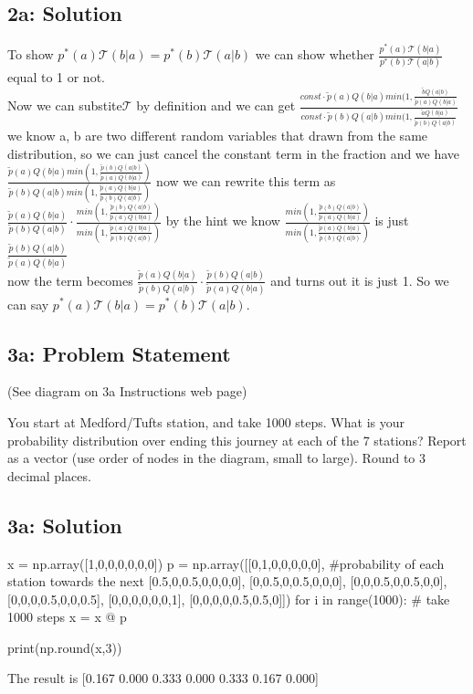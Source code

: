 \documentclass[10pt]{article}
\newcommand{\officialdirections}[1]{{\color{purple} #1}}
\begin{document}
\subsection{2a: Solution}
To show $p^*( a) \mathcal{T}( b | a)  = p^*(b) \mathcal{T}( a | b)$ we can show whether $\frac{p^*( a) \mathcal{T}( b | a)}{p^*(b) \mathcal{T}( a | b)}$ equal to 1 or not.
\\
Now we can substite$\mathcal{T}$ by definition and we can get $\frac{const\cdot\tilde{p}(a)Q(b|a)min(1, \frac{\tilde{b}Q(a|b)}{\tilde{p}(a)Q(b|a)}}{const\cdot\tilde{p}(b)Q(a|b)min(1, \frac{\tilde{a}Q(b|a)}{\tilde{p}(b)Q(a|b)}}$
\\
we know a, b are two different random variables that drawn from the same distribution, so we can just cancel the constant term in the fraction and we have 
\\
$\frac{\tilde{p}(a)Q(b|a)min(1, \frac{\tilde{p}(b)Q(a|b)}{\tilde{p}(a)Q(b|a)})}{\tilde{p}(b)Q(a|b)min(1, \frac{\tilde{p}(a)Q(b|a)}{\tilde{p}(b)Q(a|b)})}$ now we can rewrite this term as 
\\
$\frac{\tilde{p}(a)Q(b|a)}{\tilde{p}(b)Q(a|b)} \cdot \frac{min(1, \frac{\tilde{p}(b)Q(a|b)}{\tilde{p}(a)Q(b|a)})}{min(1, \frac{\tilde{p}(a)Q(b|a)}{\tilde{p}(b)Q(a|b)})}$ by the hint we know 
$\frac{min(1, \frac{\tilde{p}(b)Q(a|b)}{\tilde{p}(a)Q(b|a)})}{min(1, \frac{\tilde{p}(a)Q(b|a)}{\tilde{p}(b)Q(a|b)})}$ is just $\frac{\tilde{p}(b)Q(a|b)}{\tilde{p}(a)Q(b|a)}$
\\
now the term becomes $\frac{\tilde{p}(a)Q(b|a)}{\tilde{p}(b)Q(a|b)} \cdot \frac{\tilde{p}(b)Q(a|b)}{\tilde{p}(a)Q(b|a)}$ and turns out it is just 1. So we can say $p^*( a) \mathcal{T}( b | a)  = p^*(b) \mathcal{T}( a | b)$.



\officialdirections{
\subsection*{3a: Problem Statement}
(See diagram on 3a Instructions web page)

You start at Medford/Tufts station, and take 1000 steps. What is your probability distribution over ending this journey at each of the 7 stations? Report as a vector (use order of nodes in the diagram, small to large). Round to 3 decimal places.
}

\subsection{3a: Solution}
\begin{python}
x = np.array([1,0,0,0,0,0,0])
p = np.array([[0,1,0,0,0,0,0], #probability of each station towards the next
               [0.5,0,0.5,0,0,0,0],
               [0,0.5,0,0.5,0,0,0],
               [0,0,0.5,0,0.5,0,0],
               [0,0,0,0.5,0,0,0.5],
               [0,0,0,0,0,0,1],
               [0,0,0,0,0.5,0.5,0]])
for i in range(1000): # take 1000 steps
    x = x @ p

print(np.round(x,3))
\end{python}
The result is 
[0.167 0.000 0.333 0.000 0.333 0.167 0.000]
\end{document}
